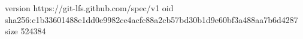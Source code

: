 version https://git-lfs.github.com/spec/v1
oid sha256:c1b33601488e1dd0e9982ce4acfc88a2cb57bd30b1d9e60bf3a488aa7b6d4287
size 524384
